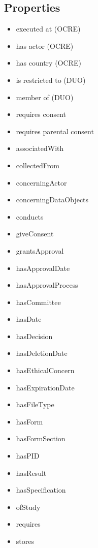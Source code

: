 \documentclass[10pt]{article}
\begin{document}
    \subsection*{Properties}
    
\begin{itemize}
    \item executed at (OCRE)
    \item has actor (OCRE)
    \item has country (OCRE)
    \item is restricted to (DUO)
    \item member of (DUO)
    \item requires consent
    \item requires parental consent
    \item associatedWith
    \item collectedFrom
    \item concerningActor
    \item concerningDataObjects
    \item conducts
    \item giveConsent
    \item grantsApproval
    \item hasApprovalDate
    \item hasApprovalProcess
    \item hasCommittee
    \item hasDate
    \item hasDecision
    \item hasDeletionDate
    \item hasEthicalConcern
    \item hasExpirationDate
    \item hasFileType
    \item hasForm
    \item hasFormSection
    \item hasPID
    \item hasResult
    \item hasSpecification
   \item  ofStudy
    \item requires
    \item stores
\end{itemize}



\newpage
\end{document}
